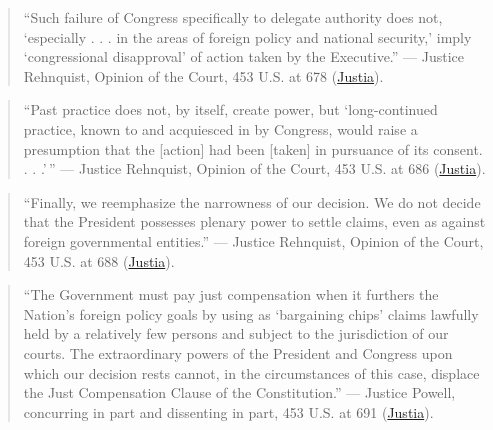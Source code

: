 \documentclass[12pt]{article}
\begin{document}
\begin{quote}
``Such failure of Congress specifically to delegate authority does not, `especially . . . in the areas of foreign policy and national security,' imply `congressional disapproval' of action taken by the Executive.'' --- Justice Rehnquist, Opinion of the Court, 453 U.S. at 678 (\href{https://supreme.justia.com/cases/federal/us/453/654/}{Justia}).
\end{quote}

\begin{quote}
``Past practice does not, by itself, create power, but `long-continued practice, known to and acquiesced in by Congress, would raise a presumption that the [action] had been [taken] in pursuance of its consent. . . .'\,'' --- Justice Rehnquist, Opinion of the Court, 453 U.S. at 686 (\href{https://supreme.justia.com/cases/federal/us/453/654/}{Justia}).
\end{quote}

\begin{quote}
``Finally, we reemphasize the narrowness of our decision. We do not decide that the President possesses plenary power to settle claims, even as against foreign governmental entities.'' --- Justice Rehnquist, Opinion of the Court, 453 U.S. at 688 (\href{https://supreme.justia.com/cases/federal/us/453/654/}{Justia}).
\end{quote}

\begin{quote}
``The Government must pay just compensation when it furthers the Nation's foreign policy goals by using as `bargaining chips' claims lawfully held by a relatively few persons and subject to the jurisdiction of our courts. The extraordinary powers of the President and Congress upon which our decision rests cannot, in the circumstances of this case, displace the Just Compensation Clause of the Constitution.'' --- Justice Powell, concurring in part and dissenting in part, 453 U.S. at 691 (\href{https://supreme.justia.com/cases/federal/us/453/654/}{Justia}).
\end{quote}
\end{document}
